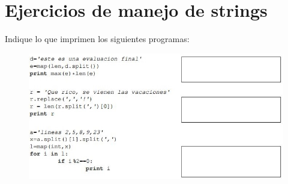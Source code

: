 \section{Ejercicios de manejo de strings}
Indique lo que imprimen los siguientes programas:
\begin{figure}[h]
    \centering
    \includegraphics{Imagenes/imagen1.jpg}
\end{figure}